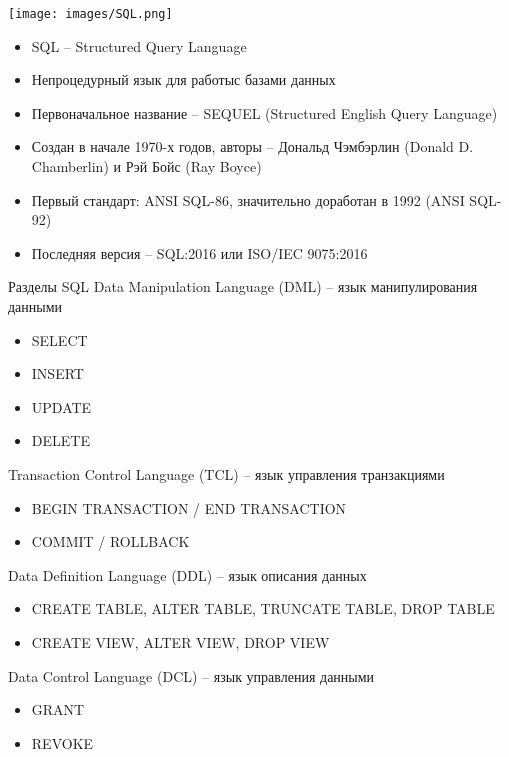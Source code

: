 \documentclass{beamer}
\begin{document}
\begin{frame}
\begin{minipage}{0.3\textwidth}
  \begin{flushleft}
	\begin{center}
		\texttt{[image: images/SQL.png]}
	\end{center}
  \end{flushleft}
\end{minipage}
\begin{minipage}{0.6\textwidth}
  \begin{flushright}
  	\begin{itemize}
		\item SQL – Structured Query Language
		\item Непроцедурный язык для работыс базами данных
		\item Первоначальное название – SEQUEL (Structured English Query Language)
		\item Создан в начале 1970-х годов, авторы – Дональд Чэмбэрлин (Donald D. Chamberlin) и Рэй Бойс (Ray Boyce)
		\item Первый стандарт: ANSI SQL-86, значительно доработан в 1992 (ANSI SQL-92)
		\item Последняя версия – SQL:2016 или ISO/IEC 9075:2016
  	\end{itemize}
  \end{flushright}
\end{minipage}
\end{frame}

\begin{frame}{Разделы SQL}
	Data Manipulation Language (DML) – язык манипулирования данными
	\begin{itemize}
		\item SELECT
		\item INSERT
		\item UPDATE
		\item DELETE
	\end{itemize}
	Transaction Control Language (TCL) – язык управления транзакциями
	\begin{itemize}
		\item BEGIN TRANSACTION / END TRANSACTION
		\item COMMIT / ROLLBACK
	\end{itemize}
	Data Definition Language (DDL) – язык описания данных
	\begin{itemize}
		\item CREATE TABLE, ALTER TABLE, TRUNCATE TABLE, DROP TABLE
		\item CREATE VIEW, ALTER VIEW, DROP VIEW
	\end{itemize}
	Data Control Language (DCL) – язык управления данными
	\begin{itemize}
		\item GRANT
		\item REVOKE
	\end{itemize}
\end{frame}
\end{document}
